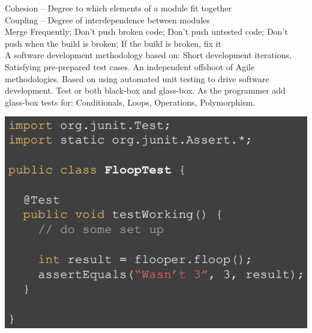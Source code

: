 \documentclass[number]{assignment}
\begin{document}
\begin{landscape}
\headfoot
\begin{multicols}{3}

Cohesion -- Degree to which elements of a module fit together\\
Coupling -- Degree of interdependence between modules\\
Merge Frequently; Don't push broken code; Don't push untested code; Don't push when the build is broken; If the build is broken, fix it\\
A software development methodology based on: Short development iterations, Satisfying pre-prepared test cases. An independent offshoot of Agile methodologies. Based on using automated unit testing to drive software development.
Test or both black-box and glass-box. As the programmer add glass-box tests for: Conditionals, Loops, Operations, Polymorphism.
\begin{multicols}{2}
\includegraphics[width=\linewidth]{test1.png}

\end{multicols}
\end{multicols}
\end{landscape}
\end{document}
